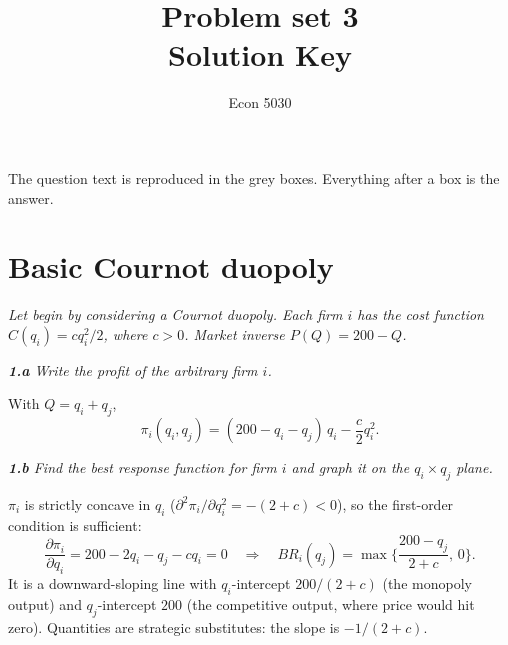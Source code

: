 \documentclass[11pt]{article}
\title{Problem set 3 \\ \large Solution Key}
\author{Econ 5030}
\date{}
\newcommand{\question}[1]{\par\smallskip\noindent\colorbox{black!6}{\parbox{\dimexpr\linewidth-2\fboxsep}{\itshape #1}}\par\smallskip}
\begin{document}
\maketitle

The question text is reproduced in the grey boxes. Everything after a box is the answer.

\section{Basic Cournot duopoly}

\question{Let begin by considering a Cournot duopoly. Each firm $i$ has the cost function $C(q_i)=cq_i^2/2$, where $c>0$. Market inverse $P(Q)=200-Q$.}

\question{\textbf{1.a} Write the profit of the arbitrary firm $i$.}

With $Q=q_i+q_j$,
\[
\pi_i(q_i,q_j)=(200-q_i-q_j)\,q_i-\frac{c}{2}q_i^2 .
\]

\question{\textbf{1.b} Find the best response function for firm $i$ and graph it on the $q_i\times q_j$ plane.}

$\pi_i$ is strictly concave in $q_i$ ($\partial^2\pi_i/\partial q_i^2=-(2+c)<0$), so the first-order condition is sufficient:
\[
\frac{\partial\pi_i}{\partial q_i}=200-2q_i-q_j-cq_i=0
\quad\Longrightarrow\quad
BR_i(q_j)=\max\Big\{\frac{200-q_j}{2+c},\,0\Big\}.
\]
It is a downward-sloping line with $q_i$-intercept $200/(2+c)$ (the monopoly output) and $q_j$-intercept $200$ (the competitive output, where price would hit zero). Quantities are strategic substitutes: the slope is $-1/(2+c)$.

\begin{center}
\end{center}
\end{document}
